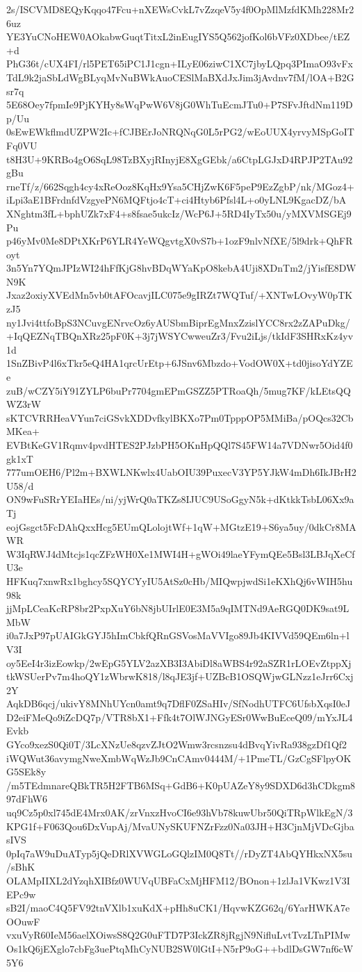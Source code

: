 2s/ISCVMD8EQyKqqo47Fcu+nXEWsCvkL7vZzqeV5y4f0OpMlMzfdKMh228Mr26uz
YE3YuCNoHEW0AOkabwGuqtTitxL2inEugIYS5Q562jofKol6bVFz0XDbee/tEZ+d
PhG36t/cUX4FI/rl5PET65iPC1J1cgn+ILyE06ziwC1XC7jbyLQpq3PImaO93vFx
TdL9k2jaSbLdWgBLyqMvNuBWkAuoCESlMaBXdJxJim3jAvdnv7fM/lOA+B2Gsr7q
5E68Oey7fpmIe9PjKYHy8sWqPwW6V8jG0WhTuEcmJTu0+P7SFvJftdNm119Dp/Uu
0sEwEWkflmdUZPW2Ic+fCJBErJoNRQNqG0L5rPG2/wEoUUX4yrvyMSpGoITFq0VU
t8H3U+9KRBo4gO6SqL98TzBXyjRInyjE8XgGEbk/a6CtpLGJxD4RPJP2TAu92gBu
rneTf/z/662Sqgh4cy4xReOoz8KqHx9Ysa5CHjZwK6F5peP9EzZgbP/nk/MGoz4+
iLpi3aE1BFrdnfdVzgyePN6MQFtjo4cT+ci4Htyb6Pfsl4L+o0yLNL9KgacDZ/bA
XNghtm3fL+bphUZk7xF4+s8fsae5ukcIz/WcP6J+5RD4IyTx50u/yMXVMSGEj9Pu
p46yMv0Me8DPtXKrP6YLR4YeWQgvtgX0vS7b+1ozF9nlvNfXE/5l9drk+QhFRoyt
3n5Yn7YQmJPIzWI24hFfKjG8hvBDqWYaKpO8kebA4Uji8XDnTm2/jYisfE8DWN9K
Jxaz2oxiyXVEdMn5vb0tAFOcavjILC075e9gIRZt7WQTuf/+XNTwLOvyW0pTKzJ5
ny1Jvi4ttfoBpS3NCuvgENrvcOz6yAUSbmBiprEgMnxZzislYCC8rx2zZAPuDkg/
+IqQEZNqTBQnXRz25pF0K+3j7jWSYCwweuZr3/Fvu2iLjs/tkIdF3SHRxKz4yv1d
1SnZBivP4l6xTkr5eQ4HA1qrcUrEtp+6JSnv6Mbzdo+VodOW0X+td0jisoYdYZEe
zuB/wCZY5iY91ZYLP6buPr7704gmEPmGSZZ5PTRoaQh/5mug7KF/kLEtsQQWZ3rW
sKTCVRRHeaVYun7ciGSvkXDDvfkylBKXo7Pm0TpppOP5MMiBa/pOQcs32CbMKea+
EVBtKeGV1Rqmv4pvdHTES2PJzbPH5OKnHpQQl7S45FW14a7VDNwr5Oid4f0gk1xT
777umOEH6/Pl2m+BXWLNKwlx4UabOIU39PuxecV3YP5YJkW4mDh6IkJBrH2U58/d
ON9wFuSRrYEIaHEs/ni/yjWrQ0aTKZs8IJUC9USoGgyN5k+dKtkkTsbL06Xx9aTj
eojGsgct5FcDAhQxxHcg5EUmQLolojtWf+1qW+MGtzE19+S6ya5uy/0dkCr8MAWR
W3IqRWJ4dMtcjs1qcZFzWH0Xe1MWI4H+gWOi49laeYFymQEe5Bsl3LBJqXeCfU3e
HFKuq7xnwRx1bghcy5SQYCYyIU5AtSz0cHb/MIQwpjwdSi1eKXhQj6vWIH5hu98k
jjMpLCeaKcRP8br2PxpXuY6bN8jbUIrlE0E3M5a9qIMTNd9AeRGQ0DK9sat9LMbW
i0a7JxP97pUAIGkGYJ5hImCbkfQRnGSVosMaVVIgo89Jb4KIVVd59QEm6ln+lV3I
oy5EeI4r3izEowkp/2wEpG5YLV2azXB3I3AbiDl8aWBS4r92aSZR1rLOEvZtppXj
tkWSUerPv7m4hoQY1zWbrwK818/l8qJE3jf+UZBcB1OSQWjwGLNzz1eJrr6Cxj2Y
AqkDB6qcj/ukivY8MNhUYcn0amt9q7DflF0ZSaHIv/SfNodhUTFC6UfsbXqsI0eJ
D2eiFMeQo9iZcDQ7p/VTR8bX1+Ffk4t7OlWJNGyESr0WwBuEceQ09/mYxJL4Evkb
GYco9xezS0Qi0T/3LcXNzUe8qzvZJtO2Wmw3rcsnzsu4dBvqYivRa938gzDf1Qf2
iWQWut36avymgNweXmbWqWzJb9CnCAmv0444M/+1PmeTL/GzCgSFlpyOKG5SEk8y
/m5TEdmnareQBkTR5H2FTB6MSq+GdB6+K0pUAZeY8y9SDXD6d3hCDkgm897dFhW6
uq9Cz5p0xl745dE4Mrx0AK/zrVnxzHvoCI6e93hVb78kuwUbr50QiTRpWlkEgN/3
KPG1f+F063Qou6DxVupAj/MvaUNySKUFNZrFzz0Na03JH+H3CjnMjVDcGjbasIVS
0pIq7aW9uDuATyp5jQeDRlXVWGLoGQlzIM0Q8Tt//rDyZT4AbQYHkxNX5su/sBhK
OLAMpIIXL2dYzqhXIBfz0WUVqUBFaCxMjHFM12/BOnon+1zlJa1VKwz1V3IEPc9w
sB2I/maoC4Q5FV92tnVXlb1xuKdX+pHh8uCK1/HqvwKZG62q/6YarHWKA7eOOuwF
vxuVyR60IeM56aelXOiwsS8Q2G0uFTD7P3IckZR8jRgjN9NifluLvtTvzLTnPIMw
Os1kQ6jEXglo7cbFg3uePtqMhCyNUB2SW0lGtI+N5rP9oG++bdlDsGW7nf6cW5Y6
